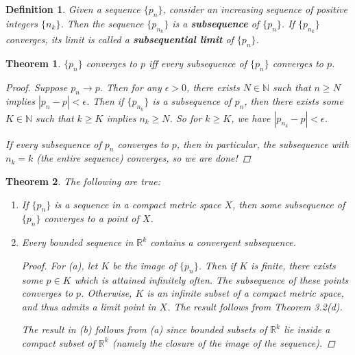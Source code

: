 \documentclass{scrbook}
\newcommand{\N}{\mathbb{N}}
\newcommand{\R}{\mathbb{R}}
\renewcommand{\to}{\rightarrow}
\newtheorem{theorem}{Theorem}
\newtheorem{definition}{Definition}
\begin{document}
\begin{definition} %
Given a sequence $\{p_n\}$, consider an increasing sequence of positive integers $\{n_k\}$. Then the sequence $\{p_{n_k}\}$ is a \textbf{subsequence} of $\{p_n\}$. If $\{p_{n_k}\}$ converges, its limit is called a \textbf{subsequential limit} of $\{p_n\}$.
\end{definition}

\begin{theorem} %
$\{p_n\}$ converges to $p$ iff every subsequence of $\{p_n\}$ converges to $p$. 

\begin{proof}
Suppose $p_n \to p$. Then for any $\epsilon > 0$, there exists $N \in \N$ such that $n \ge N$ implies $|p_n - p| < \epsilon$. Then if $\{p_{n_k}\}$ is a subsequence of $p_n$, then there exists some $K \in \N$ such that $k \ge K$ implies $n_k \ge N$. So for $k \ge K$, we have $|p_{n_k} - p| < \epsilon$. 

If every subsequence of $p_n$ converges to $p$, then in particular, the subsequence with $n_k = k$ (the entire sequence) converges, so we are done!
\end{proof}
\end{theorem}

\begin{theorem} %
The following are true:
\begin{enumerate}
\item If $\{p_n\}$ is a sequence in a compact metric space $X$, then some subsequence of $\{p_n\}$ converges to a point of $X$.

\item Every bounded sequence in $\R^k$ contains a convergent subsequence.

\begin{proof}
For (a), let $K$ be the image of $\{p_n\}$. Then if $K$ is finite, there exists some $p \in K$ which is attained infinitely often. The subsequence of these points converges to $p$. Otherwise, $K$ is an infinite subset of a compact metric space, and thus admits a limit point in $X$. The result follows from Theorem 3.2(d).

The result in (b) follows from (a) since bounded subsets of $\R^k$ lie inside a compact subset of $\R^k$ (namely the closure of the image of the sequence). 
\end{proof}
\end{enumerate}
\end{theorem}
\end{document}
